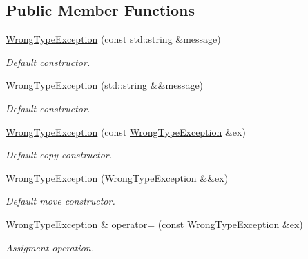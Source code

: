 \subsection*{Public Member Functions}
\begin{DoxyCompactItemize}
\item 
\hyperlink{class_dynamic_fast_buffers_1_1_wrong_type_exception_ab16f7ac66e271fc67a2539dbaf6e6b58}{Wrong\-Type\-Exception} (const std\-::string \&message)
\begin{DoxyCompactList}\small\item\em Default constructor. \end{DoxyCompactList}\item 
\hyperlink{class_dynamic_fast_buffers_1_1_wrong_type_exception_a0dce5365930718b963c7552cf6db7c7b}{Wrong\-Type\-Exception} (std\-::string \&\&message)
\begin{DoxyCompactList}\small\item\em Default constructor. \end{DoxyCompactList}\item 
\hyperlink{class_dynamic_fast_buffers_1_1_wrong_type_exception_a05ccdcc1048ae4e0ca498e62f7003445}{Wrong\-Type\-Exception} (const \hyperlink{class_dynamic_fast_buffers_1_1_wrong_type_exception}{Wrong\-Type\-Exception} \&ex)
\begin{DoxyCompactList}\small\item\em Default copy constructor. \end{DoxyCompactList}\item 
\hyperlink{class_dynamic_fast_buffers_1_1_wrong_type_exception_a0d535905c365a5bead419ae439d3d3e5}{Wrong\-Type\-Exception} (\hyperlink{class_dynamic_fast_buffers_1_1_wrong_type_exception}{Wrong\-Type\-Exception} \&\&ex)
\begin{DoxyCompactList}\small\item\em Default move constructor. \end{DoxyCompactList}\item 
\hyperlink{class_dynamic_fast_buffers_1_1_wrong_type_exception}{Wrong\-Type\-Exception} \& \hyperlink{class_dynamic_fast_buffers_1_1_wrong_type_exception_a25aa821afc8bf48c0f1901af4d1847ce}{operator=} (const \hyperlink{class_dynamic_fast_buffers_1_1_wrong_type_exception}{Wrong\-Type\-Exception} \&ex)
\begin{DoxyCompactList}\small\item\em Assigment operation. \end{DoxyCompactList}\item 

\end{DoxyCompactItemize}
